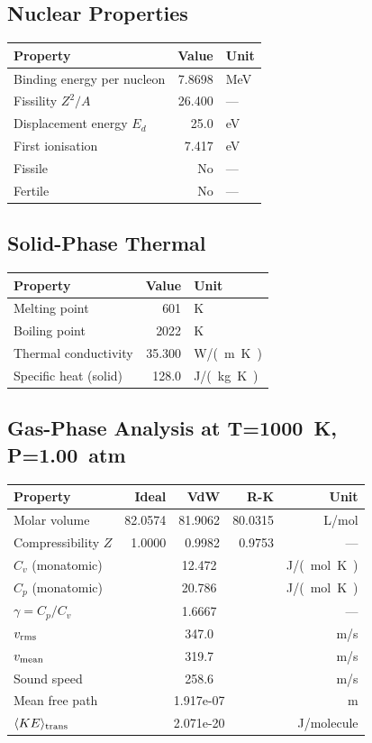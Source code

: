 \documentclass[11pt,a4paper]{article}
\begin{document}
\subsection{Nuclear Properties}
\begin{tabular}{lrl}
  \toprule
  Property & Value & Unit \\
  \midrule
  Binding energy per nucleon & 7.8698 & \si{MeV} \\
  Fissility $Z^2/A$ & 26.400 & --- \\
  Displacement energy $E_d$ & 25.0 & \si{eV} \\
  First ionisation & 7.417 & \si{eV} \\
  Fissile & No & --- \\
  Fertile & No & --- \\
  \bottomrule
\end{tabular}

\subsection{Solid-Phase Thermal}
\begin{tabular}{lrl}
  \toprule
  Property & Value & Unit \\
  \midrule
  Melting point & 601 & \si{K} \\
  Boiling point & 2022 & \si{K} \\
  Thermal conductivity & 35.300 & \si{W/(m.K)} \\
  Specific heat (solid) & 128.0 & \si{J/(kg.K)} \\
  \bottomrule
\end{tabular}

\subsection{Gas-Phase Analysis at T=\SI{1000}{K}, P=\SI{1.00}{atm}}
\begin{tabular}{lrrrr}
  \toprule
  Property & Ideal & VdW & R-K & Unit \\
  \midrule
  Molar volume & 82.0574 & 81.9062 & 80.0315 & \si{L/mol} \\
  Compressibility $Z$ & 1.0000 & 0.9982 & 0.9753 & --- \\
  \midrule
  $C_v$ (monatomic) & \multicolumn{3}{c}{12.472} & \si{J/(mol.K)} \\
  $C_p$ (monatomic) & \multicolumn{3}{c}{20.786} & \si{J/(mol.K)} \\
  $\gamma = C_p/C_v$ & \multicolumn{3}{c}{1.6667} & --- \\
  $v_{\rm rms}$ & \multicolumn{3}{c}{347.0} & \si{m/s} \\
  $v_{\rm mean}$ & \multicolumn{3}{c}{319.7} & \si{m/s} \\
  Sound speed & \multicolumn{3}{c}{258.6} & \si{m/s} \\
  Mean free path & \multicolumn{3}{c}{1.917e-07} & \si{m} \\
  $\langle KE \rangle_{\rm trans}$ & \multicolumn{3}{c}{2.071e-20} & \si{J/molecule} \\
  \bottomrule
\end{tabular}
\end{document}
